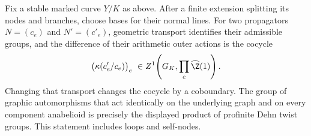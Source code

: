 \begin{lemma}\label{A6-normal-kummer}
Fix a stable marked curve $Y/K$ as above. After a finite extension splitting its nodes and branches, choose bases for their normal lines. For two propagators $N=(c_e)$ and $N'=(c'_e)$, geometric transport identifies their admissible groups, and the difference of their arithmetic outer actions is the cocycle
\[
 \bigl(\kappa(c'_e/c_e)\bigr)_e
 \ \in Z^1\!\left(G_K,\prod_e\widehat{\Z}(1)\right).
\]
Changing that transport changes the cocycle by a coboundary. The group of graphic automorphisms that act identically on the underlying graph and on every component anabelioid is precisely the displayed product of profinite Dehn twist groups. This statement includes loops and self-nodes.
\end{lemma}
